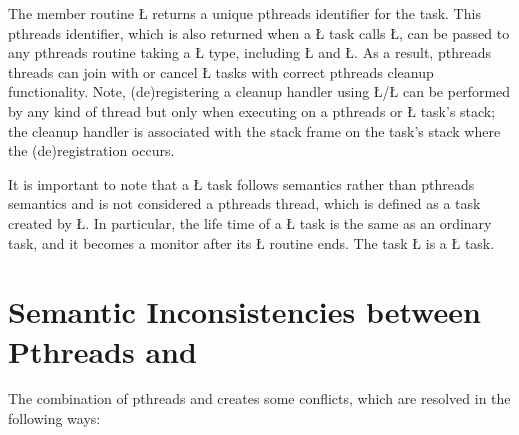 \documentclass[openright,twoside]{report}
\begin{document}
The member routine \LGinlinetrue\LGbegin\lgrinde\L{}\endlgrinde\LGend{} returns a unique pthreads identifier for the task.
This pthreads identifier, which is also returned when a \LGinlinetrue\LGbegin\lgrinde\L{}\endlgrinde\LGend{} task calls \LGinlinetrue\LGbegin\lgrinde\L{}\endlgrinde\LGend{}, can be passed to any pthreads routine taking a \LGinlinetrue\LGbegin\lgrinde\L{}\endlgrinde\LGend{} type, including \LGinlinetrue\LGbegin\lgrinde\L{}\endlgrinde\LGend{} and \LGinlinetrue\LGbegin\lgrinde\L{}\endlgrinde\LGend{}.
As a result, pthreads threads can join with or cancel \LGinlinetrue\LGbegin\lgrinde\L{}\endlgrinde\LGend{} tasks with correct pthreads cleanup functionality.
Note, (de)registering a cleanup handler using \LGinlinetrue\LGbegin\lgrinde\L{}\endlgrinde\LGend{}/\-\LGinlinetrue\LGbegin\lgrinde\L{}\endlgrinde\LGend{} can be performed by any kind of thread but only when executing on a pthreads or \LGinlinetrue\LGbegin\lgrinde\L{}\endlgrinde\LGend{} task's stack;
the cleanup handler is associated with the stack frame on the task's stack where the (de)registration occurs.

It is important to note that a \LGinlinetrue\LGbegin\lgrinde\L{}\endlgrinde\LGend{} task follows \uC semantics rather than pthreads semantics and is not considered a pthreads thread, which is defined as a task created by \LGinlinetrue\LGbegin\lgrinde\L{}\endlgrinde\LGend{}.
In particular, the life time of a \LGinlinetrue\LGbegin\lgrinde\L{}\endlgrinde\LGend{} task is the same as an ordinary \uC task, and it becomes a monitor after its \LGinlinetrue\LGbegin\lgrinde\L{}\endlgrinde\LGend{} routine ends.
The task \LGinlinetrue\LGbegin\lgrinde\L{}\endlgrinde\LGend{} is a \LGinlinetrue\LGbegin\lgrinde\L{}\endlgrinde\LGend{} task.


\section{\texorpdfstring{Semantic Inconsistencies between Pthreads and \uC}{Semantic Inconsistencies between Pthreads and uC++}}

The combination of pthreads and \uC creates some conflicts, which are resolved in the following ways:
\end{document}

